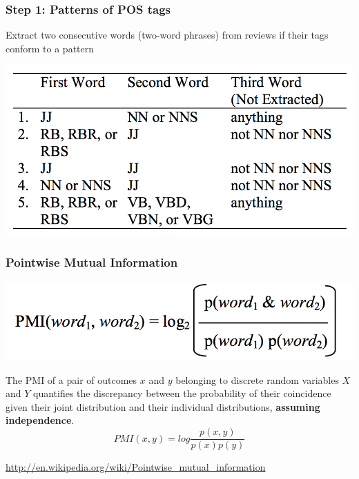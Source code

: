 \documentclass[t]{beamer}
\begin{document}
\begin{frame} \frametitle{ Step 1: Patterns of POS tags} %

Extract two consecutive words (two-word phrases) from reviews if their
tags conform to a pattern

\begin{center}
     \includegraphics[width=\textwidth]{turney01}
\end{center}

\end{frame} 

\begin{frame} \frametitle{Pointwise Mutual Information}

\begin{center}
     \includegraphics[width=.8\textwidth]{turney02}
\end{center}

\vfill

\begin{center}
\small{
The PMI of a pair of outcomes $x$ and $y$ belonging to discrete random
variables $X$ and $Y$ quantifies the discrepancy between the probability
of their coincidence given their joint distribution and their
individual distributions, \textbf{assuming independence}. } \\

\begin{equation*}
PMI(x,y) = log \frac{p(x,y)}{p(x)p(y)}
\end{equation*}

\tiny{\url{http://en.wikipedia.org/wiki/Pointwise_mutual_information}}
\end{center}
\end{frame}
\end{document}
